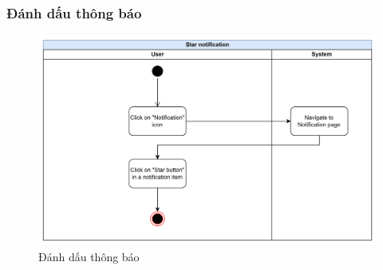 \subsubsection{Đánh dấu thông báo}
\begin{figure}[H]
    \centering
    \includegraphics[width=\linewidth]{Content/Phân tích và thiết kế hệ thống/documents/Sơ đồ hoạt động/images/starNotification.png}
    \vspace{0.5cm}
    \caption{Đánh dấu thông báo}
    \label{fig:Đánh dấu thông báo}
\end{figure}